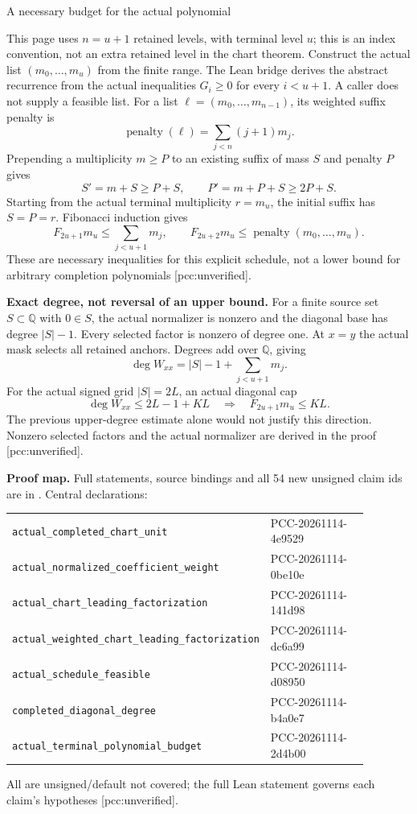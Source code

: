 \documentclass[10pt]{article}
\begin{document}
\newpage
\begin{center}{\Large A necessary budget for the actual polynomial}\end{center}
This page uses $n=u+1$ retained levels, with terminal level $u$; this is an
index convention, not an extra retained level in the chart theorem.
Construct the actual list $(m_0,\ldots,m_u)$ from the finite range. The
Lean bridge derives the abstract recurrence from the actual inequalities
$G_i\ge0$ for every $i<u+1$. A caller does not supply a feasible list.
For a list $\ell=(m_0,\ldots,m_{n-1})$, its weighted suffix penalty is
\[
 \operatorname{penalty}(\ell)=\sum_{j<n}(j+1)m_j.
\]
Prepending a multiplicity $m\ge P$ to an existing suffix of mass $S$ and
penalty $P$ gives
\[
 S'=m+S\ge P+S,\qquad P'=m+P+S\ge2P+S.
\]
Starting from the actual terminal multiplicity $r=m_u$, the initial suffix
has $S=P=r$. Fibonacci induction gives
\[
 F_{2u+1}m_u\le\sum_{j<u+1}m_j,\qquad
 F_{2u+2}m_u\le\operatorname{penalty}(m_0,\ldots,m_u).
\]
These are necessary inequalities for this explicit schedule, not a
lower bound for arbitrary completion polynomials [pcc:unverified].

\textbf{Exact degree, not reversal of an upper bound.}
For a finite source set $S\subset\mathbb Q$ with $0\in S$, the actual
normalizer is nonzero and the diagonal base has degree $|S|-1$.
Every selected factor is nonzero of degree one. At $x=y$ the actual mask
selects all retained anchors. Degrees add over $\mathbb Q$, giving
\[
 \deg W_{xx}=|S|-1+\sum_{j<u+1}m_j.
\]
For the actual signed grid $|S|=2L$, an actual diagonal cap
\[
 \deg W_{xx}\le 2L-1+KL
 \quad\Longrightarrow\quad F_{2u+1}m_u\le KL.
\]
The previous upper-degree estimate alone would not justify this direction.
Nonzero selected factors and the actual normalizer are derived in the proof
[pcc:unverified].

\textbf{Proof map.} Full statements, source bindings and all 54 new unsigned
claim ids are in . Central declarations:
\begin{center}\small
\begin{tabular}{p{0.59\linewidth}p{0.29\linewidth}}
\texttt{actual\_completed\_chart\_unit} & PCC-20261114-4e9529\\
\texttt{actual\_normalized\_coefficient\_weight} & PCC-20261114-0be10e\\
\texttt{actual\_chart\_leading\_factorization} & PCC-20261114-141d98\\
\texttt{actual\_weighted\_chart\_leading\_factorization} & PCC-20261114-dc6a99\\
\texttt{actual\_schedule\_feasible} & PCC-20261114-d08950\\
\texttt{completed\_diagonal\_degree} & PCC-20261114-b4a0e7\\
\texttt{actual\_terminal\_polynomial\_budget} & PCC-20261114-2d4b00
\end{tabular}
\end{center}
All are unsigned/default not covered; the full Lean statement governs each
claim's hypotheses [pcc:unverified].
\end{document}
